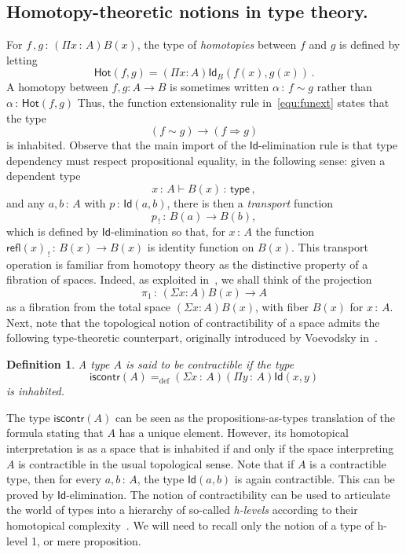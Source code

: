 \documentclass[10pt,a4paper,oneside,reqno]{amsart}
\theoremstyle{mythm}
\theoremstyle{mydef}
\newtheorem{definition}[theorem]{Definition}
\theoremstyle{myrmk}
\newcommand{\deq}{=}
\newcommand{\defeq}{=_{\mathrm{def}}}
\newcommand{\co}{\,{:}\,}
\newcommand{\type}{\mathsf{type}}
\newcommand{\iscontr}{\mathsf{iscontr}}
\newcommand{\Hot}{\mathsf{Hot}}
\newcommand{\Id}{\mathsf{Id}}
\newcommand{\refl}{\mathsf{refl}}
\begin{document}
\subsection*{Homotopy-theoretic notions in type theory.} For $f \, , g \co (\Pi x \co A) B(x)$, the type of
\emph{homotopies} between $f$ and $g$ is defined by letting
\[
\Hot(f,g) \deq (\Pi x:A) \Id_{B}(f(x),g(x)) \, .
\]
A homotopy between $f, g :A\to B$ is sometimes written $\alpha \co f \sim g$ rather than $\alpha \co \Hot(f,g)$
Thus, the function extensionality rule in~\eqref{equ:funext} states that the type 
\[
(f \sim g) \rightarrow (f \Rightarrow g)
\] 
is inhabited. Observe that the main import of the 
$\Id$-elimination rule is that  type dependency must respect propositional equality, in the following sense: given a dependent type
\begin{equation*}
x\co A \vdash B(x) \co \type \, ,
\end{equation*} 
and any $a,b\co A$ with $p\co \Id(a,b)$, there is then a \emph{transport} function 
 $$p_{\, ! } \co B(a) \rightarrow B(b),$$ which is defined by $\Id$-elimination so that, for $x \co A$
the function $\refl(x)_{\, !} \co B(x) \rightarrow B(x)$ is identity function on $B(x)$.  This transport operation is familiar from homotopy theory as the distinctive property of a fibration of spaces.  Indeed, as exploited
in~\cite{AwodeyS:homtmi}, we shall think of the projection 
\[
\pi_1 \co (\Sigma x:A) B(x) \to A
\] 
as a fibration from the total space $(\Sigma x:A)B(x)$, with fiber $B(x)$ for $x\co A$.
Next, note that the topological notion of contractibility of a space admits the following type-theoretic counterpart, originally
 introduced by Voevodsky in~\cite{VoevodskyV:unifc}.

\begin{definition}  A type $A$ is said to be \emph{contractible} if the  type 
 \begin{equation}
 \label{eq:contractible}
\iscontr(A) \defeq (\Sigma x\co A) (\Pi y\co A) \Id(x,y)
\end{equation}
is inhabited.
\end{definition} 

The type $\iscontr(A)$ can be seen as the propositions-as-types translation
of the formula stating that $A$ has a unique element. However, its homotopical interpretation 
is as a space that is inhabited if and only if the space interpreting $A$ is contractible in the usual
topological sense. Note that if $A$ is a contractible type, then for every $a, b \co A$, the type $\Id(a,b)$ is again contractible. 
This can be proved  by $\Id$-elimination. 
The notion of contractibility can be used to articulate the world of types  into a hierarchy of so-called \emph{h-levels} according to their
homotopical complexity~\cite{VoevodskyV:unifc}. We will need to recall only the notion of a type of h-level 1, or 
mere proposition.
\end{document}
